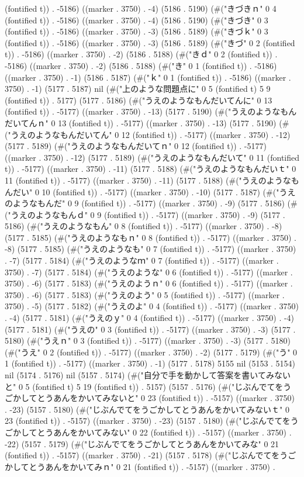 {{(fontified t)) . -5186) ((marker . 3750) . -4) (5186 . 5190) (#("きづきｎ" 0 4 (fontified t)) . -5186) ((marker . 3750) . -4) (5186 . 5190) (#("きづき" 0 3 (fontified t)) . -5186) ((marker . 3750) . -3) (5186 . 5189) (#("きづｋ" 0 3 (fontified t)) . -5186) ((marker . 3750) . -3) (5186 . 5189) (#("きづ" 0 2 (fontified t)) . -5186) ((marker . 3750) . -2) (5186 . 5188) (#("きｄ" 0 2 (fontified t)) . -5186) ((marker . 3750) . -2) (5186 . 5188) (#("き" 0 1 (fontified t)) . -5186) ((marker . 3750) . -1) (5186 . 5187) (#("ｋ" 0 1 (fontified t)) . -5186) ((marker . 3750) . -1) (5177 . 5187) nil (#("上のような問題点に" 0 5 (fontified t) 5 9 (fontified t)) . 5177) (5177 . 5186) (#("うえのようなもんだいてんに" 0 13 (fontified t)) . -5177) ((marker . 3750) . -13) (5177 . 5190) (#("うえのようなもんだいてんｎ" 0 13 (fontified t)) . -5177) ((marker . 3750) . -13) (5177 . 5190) (#("うえのようなもんだいてん" 0 12 (fontified t)) . -5177) ((marker . 3750) . -12) (5177 . 5189) (#("うえのようなもんだいてｎ" 0 12 (fontified t)) . -5177) ((marker . 3750) . -12) (5177 . 5189) (#("うえのようなもんだいて" 0 11 (fontified t)) . -5177) ((marker . 3750) . -11) (5177 . 5188) (#("うえのようなもんだいｔ" 0 11 (fontified t)) . -5177) ((marker . 3750) . -11) (5177 . 5188) (#("うえのようなもんだい" 0 10 (fontified t)) . -5177) ((marker . 3750) . -10) (5177 . 5187) (#("うえのようなもんだ" 0 9 (fontified t)) . -5177) ((marker . 3750) . -9) (5177 . 5186) (#("うえのようなもんｄ" 0 9 (fontified t)) . -5177) ((marker . 3750) . -9) (5177 . 5186) (#("うえのようなもん" 0 8 (fontified t)) . -5177) ((marker . 3750) . -8) (5177 . 5185) (#("うえのようなもｎ" 0 8 (fontified t)) . -5177) ((marker . 3750) . -8) (5177 . 5185) (#("うえのようなも" 0 7 (fontified t)) . -5177) ((marker . 3750) . -7) (5177 . 5184) (#("うえのようなｍ" 0 7 (fontified t)) . -5177) ((marker . 3750) . -7) (5177 . 5184) (#("うえのような" 0 6 (fontified t)) . -5177) ((marker . 3750) . -6) (5177 . 5183) (#("うえのようｎ" 0 6 (fontified t)) . -5177) ((marker . 3750) . -6) (5177 . 5183) (#("うえのよう" 0 5 (fontified t)) . -5177) ((marker . 3750) . -5) (5177 . 5182) (#("うえのよ" 0 4 (fontified t)) . -5177) ((marker . 3750) . -4) (5177 . 5181) (#("うえのｙ" 0 4 (fontified t)) . -5177) ((marker . 3750) . -4) (5177 . 5181) (#("うえの" 0 3 (fontified t)) . -5177) ((marker . 3750) . -3) (5177 . 5180) (#("うえｎ" 0 3 (fontified t)) . -5177) ((marker . 3750) . -3) (5177 . 5180) (#("うえ" 0 2 (fontified t)) . -5177) ((marker . 3750) . -2) (5177 . 5179) (#("う" 0 1 (fontified t)) . -5177) ((marker . 3750) . -1) (5177 . 5178) 5155 nil (5153 . 5154) nil (5174 . 5176) nil (5157 . 5174) (#("自分で手を動かして答案を書いてみないと" 0 5 (fontified t) 5 19 (fontified t)) . 5157) (5157 . 5176) (#("じぶんでてをうごかしてとうあんをかいてみないと" 0 23 (fontified t)) . -5157) ((marker . 3750) . -23) (5157 . 5180) (#("じぶんでてをうごかしてとうあんをかいてみないｔ" 0 23 (fontified t)) . -5157) ((marker . 3750) . -23) (5157 . 5180) (#("じぶんでてをうごかしてとうあんをかいてみない" 0 22 (fontified t)) . -5157) ((marker . 3750) . -22) (5157 . 5179) (#("じぶんでてをうごかしてとうあんをかいてみな" 0 21 (fontified t)) . -5157) ((marker . 3750) . -21) (5157 . 5178) (#("じぶんでてをうごかしてとうあんをかいてみｎ" 0 21 (fontified t)) . -5157) ((marker . 3750) . }}
